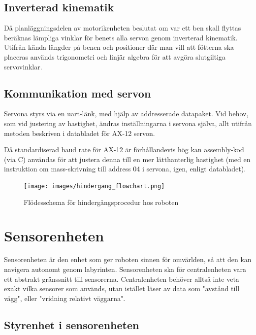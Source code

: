 \documentclass[a4paper,titlepage,12pt]{article}
\begin{document}
	\subsection{Inverterad kinematik}
	\label{sub:inverterad-kinematik}
	Då planläggningsdelen av motorikenheten beslutat om var ett ben skall flyttas beräknas 
	lämpliga vinklar för benets alla servon genom inverterad kinematik. Utifrån kända 
	längder på benen och positioner där man vill att fötterna ska placeras används 
	trigonometri och linjär algebra för att avgöra slutgiltiga servovinklar.

	\subsection{Kommunikation med servon}
	Servona styrs via en uart-länk, med hjälp av addresserade datapaket. Vid behov, 
	som vid justering av hastighet, ändras inställningarna i servona själva, allt 
	utifrån metoden beskriven i databladet för AX-12 servon.
	
	Då standardiserad baud rate för AX-12 är förhållandevis hög kan assembly-kod (via C) 
	användas för att justera denna till en mer lätthanterlig hastighet (med en instruktion
	om mass-skrivning till address 04 i servona, igen, enligt databladet).
	
	\begin{figure}[h!]
		\centering
		\texttt{[image: images/hindergang\_flowchart.png]}
		\caption{Flödesschema för hindergångsprocedur hos roboten \label{fig:walkflow1}}
	\end{figure}
    
    \newpage

	\section{Sensorenheten}
	
	Sensorenheten är den enhet som ger roboten sinnen för omvärlden, så att den
	kan navigera autonomt genom labyrinten. Sensorenheten ska för
	centralenheten vara ett abstrakt gränssnitt till sensorerna. Centralenheten
	behöver alltså inte veta exakt vilka sensorer som används, utan istället
	läser av data som "avstånd till vägg", eller "vridning relativt väggarna".

	\subsection{Styrenhet i sensorenheten}
\end{document}
